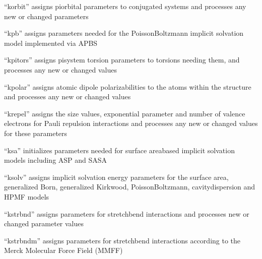 \documentclass[letterpaper,11pt,english]{sphinxmanual}
\begin{document}
\sphinxAtStartPar
{}

\sphinxAtStartPar
“korbit” assigns pi\sphinxhyphen{}orbital parameters to conjugated systems and processes any new or changed parameters

\sphinxAtStartPar
{}

\sphinxAtStartPar
“kpb” assigns parameters needed for the Poisson\sphinxhyphen{}Boltzmann implicit solvation model implemented via APBS

\sphinxAtStartPar
{}

\sphinxAtStartPar
“kpitors” assigns pi\sphinxhyphen{}system torsion parameters to torsions needing them, and processes any new or changed values

\sphinxAtStartPar
{}

\sphinxAtStartPar
“kpolar” assigns atomic dipole polarizabilities to the atoms within the structure and processes any new or changed values

\sphinxAtStartPar
{}

\sphinxAtStartPar
“krepel” assigns the size values, exponential parameter and number of valence electrons for Pauli repulsion interactions and processes any new or changed values for these parameters

\sphinxAtStartPar
{}

\sphinxAtStartPar
“ksa” initializes parameters needed for surface area\sphinxhyphen{}based implicit solvation models including ASP and SASA

\sphinxAtStartPar
{}

\sphinxAtStartPar
“ksolv” assigns implicit solvation energy parameters for the surface area, generalized Born, generalized Kirkwood, Poisson\sphinxhyphen{}Boltzmann, cavity\sphinxhyphen{}dispersion and HPMF models

\sphinxAtStartPar
{}

\sphinxAtStartPar
“kstrbnd” assigns parameters for stretch\sphinxhyphen{}bend interactions and processes new or changed parameter values

\sphinxAtStartPar
{}

\sphinxAtStartPar
“kstrbndm” assigns parameters for stretch\sphinxhyphen{}bend interactions according to the Merck Molecular Force Field (MMFF)
\end{document}
